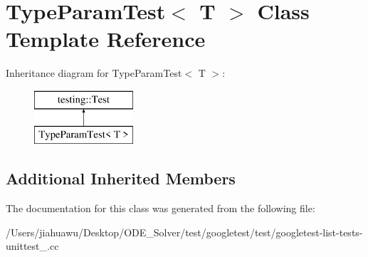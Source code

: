 \hypertarget{class_type_param_test}{}\section{Type\+Param\+Test$<$ T $>$ Class Template Reference}
\label{class_type_param_test}
Inheritance diagram for Type\+Param\+Test$<$ T $>$\+:\begin{figure}[H]
\begin{center}
\leavevmode
\includegraphics[height=2.000000cm]{class_type_param_test}
\end{center}
\end{figure}
\subsection*{Additional Inherited Members}


The documentation for this class was generated from the following file\+:\begin{DoxyCompactItemize}
\item 
/\+Users/jiahuawu/\+Desktop/\+O\+D\+E\+\_\+\+Solver/test/googletest/test/googletest-\/list-\/tests-\/unittest\+\_\+.\+cc\end{DoxyCompactItemize}
